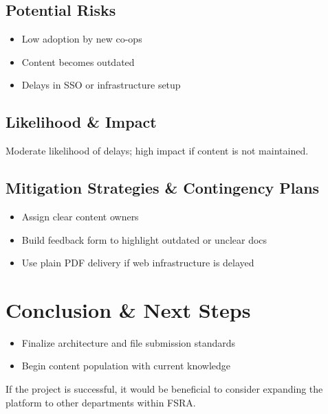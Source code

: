 \documentclass[11pt,a4paper]{article}
\begin{document}
\subsection{Potential Risks}
\begin{itemize}
  \item Low adoption by new co-ops
  \item Content becomes outdated
  \item Delays in SSO or infrastructure setup
\end{itemize}

\subsection{Likelihood \& Impact}
Moderate likelihood of delays; high impact if content is not maintained.

\subsection{Mitigation Strategies \& Contingency Plans}
\begin{itemize}
  \item Assign clear content owners
  \item Build feedback form to highlight outdated or unclear docs
  \item Use plain PDF delivery if web infrastructure is delayed
\end{itemize}

\section{Conclusion \& Next Steps}
\begin{itemize}
  \item Finalize architecture and file submission standards
  \item Begin content population with current knowledge
\end{itemize}
If the project is successful, it would be beneficial to consider expanding the platform to other departments within FSRA.
\end{document}
